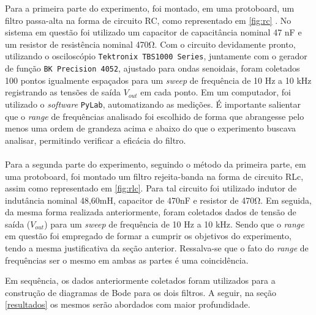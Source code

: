 
Para a primeira parte do experimento, foi montado, em uma protoboard, um filtro passa-alta na forma de  circuito RC, como representado em \ref{fig:rc} . No sistema em questão foi utilizado um capacitor de capacitância nominal 47 \si{\nano\farad} e um resistor de resistência nominal 470\si{\ohm}. Com o circuito devidamente pronto, utilizando o osciloscópio \texttt{Tektronix TBS1000 Series}, juntamente com o gerador de função \texttt{BK Precision 4052}, ajustado para ondas senoidais, foram coletados 100 pontos igualmente espaçados para um \textit{sweep} de frequência de 10 \si{\hertz} a 10 \si{\kilo\hertz} registrando as tensões de saída $V_{out}$ em cada ponto. Em um computador, foi utilizado o \textit{software} \texttt{PyLab}, automatizando as medições. É importante salientar que o \textit{range} de frequências analisado foi escolhido de forma que abrangesse pelo menos uma ordem de grandeza acima e abaixo do que o experimento buscava analisar, permitindo verificar a eficácia do filtro.\\ \\

Para a segunda parte do experimento, seguindo o método da primeira parte, em uma protoboard, foi montado um filtro rejeita-banda na forma de circuito RLc, assim como representado em \ref{fig:rlc}. Para tal circuito foi utilizado indutor de indutância nominal 48,60\si{\milli\henry}, capacitor de 470\si{\nano\farad} e resistor de 470\si{\ohm}. Em seguida, da mesma forma realizada anteriormente, foram coletados dados de tensão de saída ($V_{out}$) para um \textit{sweep} de frequência de 10 \si{\hertz} a 10 \si{\kilo\hertz}. Sendo que o \textit{range} em questão foi empregado de formar a cumprir os objetivos do experimento, tendo a mesma justificativa da seção anterior. Ressalva-se que o fato do \textit{range} de frequências ser o mesmo em ambas as partes é uma coincidência.


 Em sequência, os dados anteriormente coletados foram utilizados para a construção de diagramas de Bode para os dois filtros. A seguir, na seção \ref{resultados} os mesmos serão abordados com maior profundidade. 

\begin{figure}
    
    \label{fig:circuitos}
\end{figure}